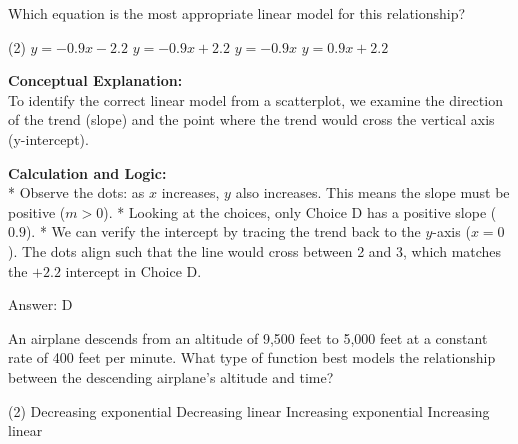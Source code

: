 \documentclass[11pt,paper=a4,answers]{exam}
\begin{document}
\begin{questions}
\question
\begin{center}
\end{center}
Which equation is the most appropriate linear model for this relationship?
\begin{tasks}(2)
    \task $y = -0.9x - 2.2$
    \task $y = -0.9x + 2.2$
    \task $y = -0.9x$
    \task $y = 0.9x + 2.2$
\end{tasks}

\begin{solution}
\textbf{Conceptual Explanation:} \\
To identify the correct linear model from a scatterplot, we examine the direction of the trend (slope) and the point where the trend would cross the vertical axis (y-intercept).

\vspace{30pt}

\textbf{Calculation and Logic:} \\
* Observe the dots: as $x$ increases, $y$ also increases. This means the slope must be positive ($m > 0$).
* Looking at the choices, only Choice D has a positive slope ($0.9$).
* We can verify the intercept by tracing the trend back to the $y$-axis ($x=0$). The dots align such that the line would cross between 2 and 3, which matches the $+2.2$ intercept in Choice D.

\vspace{30pt}

Answer: \colorbox{yellow!100}{D}
\end{solution}

\vspace{60pt}

\question
An airplane descends from an altitude of 9,500 feet to 5,000 feet at a constant rate of 400 feet per minute. What type of function best models the relationship between the descending airplane's altitude and time?
\begin{tasks}(2)
    \task Decreasing exponential
    \task Decreasing linear
    \task Increasing exponential
    \task Increasing linear
\end{tasks}


\end{questions}
\end{document}
